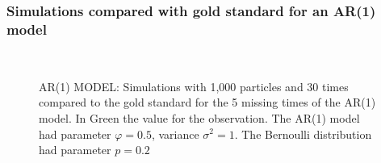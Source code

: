 \documentclass[9pt, xcolor={dvipsnames,svgnames,table}]{beamer}
\begin{document}
\begin{frame}
\frametitle{Simulations compared with gold standard for an AR(1) model}
\begin{figure}

    \captionsetup{font=footnotesize}
    \\
    \caption{AR(1) MODEL: Simulations with 1,000 particles and 30 times compared to the gold standard for the 5 missing times of the AR(1) model. In Green the value for the observation. The AR(1) model had parameter $\varphi = 0.5$, variance $\sigma^2 = 1$. The Bernoulli distribution had parameter $p = 0.2$}
\label{fig:1}
\end{figure}
\end{frame}
\end{document}

